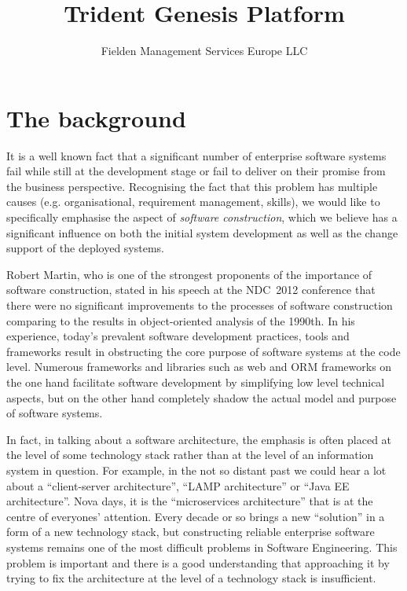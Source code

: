 \documentclass[a4paper,10pt,oneside,openright,final]{memoir} %
\title{Trident Genesis Platform}
\author{Fielden Management Services Europe LLC}
\date{}
\begin{document}
\maketitle

\onehalfspacing

\BgThispage

\section*{The background}

	It is a well known fact that a significant number of enterprise software systems fail while still at the development stage or fail to deliver on their promise from the business perspective.  
  	Recognising the fact that this problem has multiple causes (e.g. organisational, requirement management, skills), we would like to specifically emphasise the aspect of \emph{software construction}, which we believe has a significant influence on both the initial system development as well as the change support of the deployed systems.  
  
  	Robert Martin, who is one of the strongest proponents of the importance of software construction, stated in his speech at the NDC~2012 conference that there were no significant improvements to the processes of software construction comparing to the results in object-oriented analysis of the 1990th. 
  	In his experience, today's prevalent software development practices, tools and frameworks result in obstructing the core purpose of software systems at the code level.
  	Numerous frameworks and libraries such as web and ORM frameworks on the one hand facilitate software development by simplifying low level technical aspects, but on the other hand completely shadow the actual model and purpose of software systems.  
  	
	In fact, in talking about a software architecture, the emphasis is often placed at the level of some technology stack rather than at the level of an information system in question.
	For example, in the not so distant past we could hear a lot about a ``client-server architecture'', ``LAMP architecture'' or ``Java EE architecture''.
	Nova days, it is the ``microservices architecture'' that is at the centre of everyones' attention.
	Every decade or so brings a new ``solution'' in a form of a new technology stack, but constructing reliable enterprise software systems remains one of the most difficult problems in Software Engineering.	
	This problem is important and there is a good understanding that approaching it by trying to fix the architecture at the level of a technology stack is insufficient.
\end{document}
